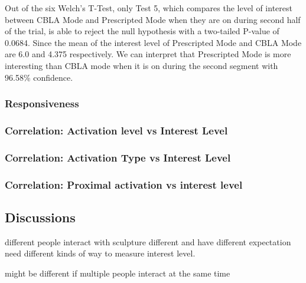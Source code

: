 Out of the six Welch's T-Test, only Test 5, which compares the level of interest between CBLA Mode and Prescripted Mode when they are on during second half of the trial, is able to reject the null hypothesis with a two-tailed P-value of 0.0684. Since the mean of the interest level of Prescripted Mode and CBLA Mode are 6.0 and 4.375 respectively. We can interpret that Prescripted Mode is more interesting than CBLA mode when it is on during the second segment with 96.58\% confidence.
 
\subsubsection{Responsiveness}

\subsubsection{Correlation: Activation level vs Interest Level}

\subsubsection{Correlation: Activation Type vs Interest Level}
\subsubsection{Correlation: Proximal activation vs interest level}



\subsection{Discussions}

different people interact with sculpture different and have different expectation
need different kinds of way to measure interest level. 

might be different if multiple people interact at the same time



